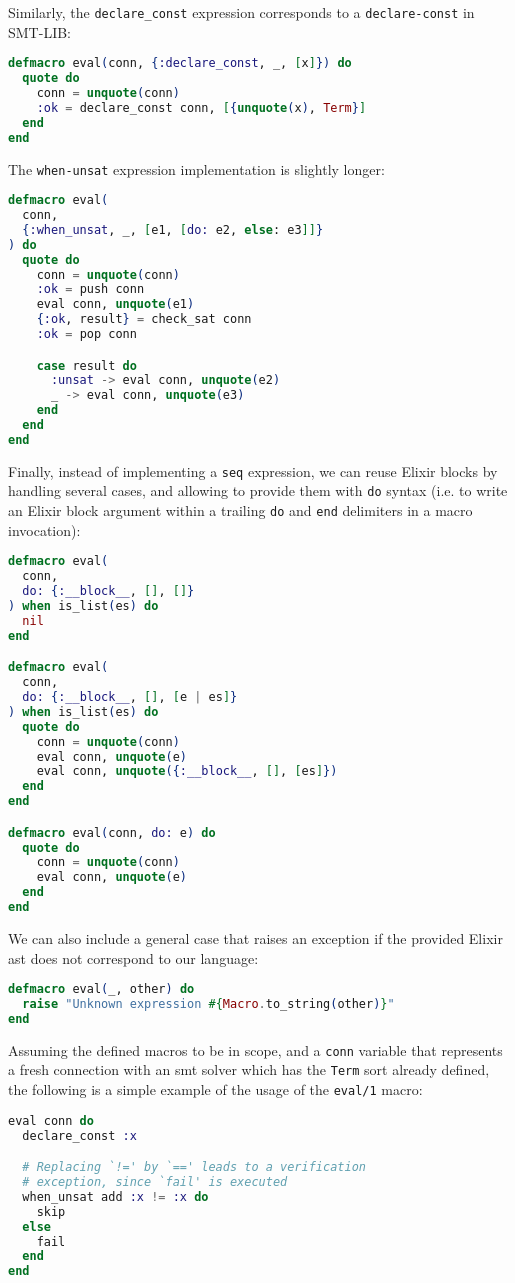 Similarly, the \verb|declare_const| expression corresponds to a
\verb|declare-const| in SMT-LIB:

\begin{lstlisting}[language=elixir,numbers=none,frame=none]
defmacro eval(conn, {:declare_const, _, [x]}) do
  quote do
    conn = unquote(conn)
    :ok = declare_const conn, [{unquote(x), Term}]
  end
end
\end{lstlisting}

The \verb|when-unsat| expression implementation is slightly longer:

\begin{lstlisting}[language=elixir,numbers=none,frame=none]
defmacro eval(
  conn, 
  {:when_unsat, _, [e1, [do: e2, else: e3]]}
) do
  quote do
    conn = unquote(conn)
    :ok = push conn
    eval conn, unquote(e1)
    {:ok, result} = check_sat conn
    :ok = pop conn

    case result do
      :unsat -> eval conn, unquote(e2)
      _ -> eval conn, unquote(e3)
    end
  end
end
\end{lstlisting}

Finally, instead of implementing a \verb|seq| expression, we can reuse Elixir
blocks by handling several cases, and allowing to provide them with \verb|do|
syntax (i.e. to write an Elixir block argument within a trailing \verb|do| and
\verb|end| delimiters in a macro invocation):

\begin{lstlisting}[language=elixir,numbers=none,frame=none]
defmacro eval(
  conn, 
  do: {:__block__, [], []}
) when is_list(es) do
  nil
end

defmacro eval(
  conn, 
  do: {:__block__, [], [e | es]}
) when is_list(es) do
  quote do
    conn = unquote(conn)
    eval conn, unquote(e)
    eval conn, unquote({:__block__, [], [es]})
  end
end

defmacro eval(conn, do: e) do
  quote do
    conn = unquote(conn)
    eval conn, unquote(e)
  end
end
\end{lstlisting}

We can also include a general case that raises an exception if the provided
Elixir \gls{ast} does not correspond to our language:

\begin{lstlisting}[language=elixir,numbers=none,frame=none]
defmacro eval(_, other) do
  raise "Unknown expression #{Macro.to_string(other)}"
end
\end{lstlisting}

Assuming the defined macros to be in scope, and a \verb|conn| variable that
represents a fresh connection with an \acrshort{smt} solver which has the
\verb|Term| sort already defined, the following is a simple example of the usage
of the \verb|eval/1| macro:

\begin{lstlisting}[language=elixir,numbers=none,frame=none]
eval conn do
  declare_const :x

  # Replacing `!=' by `==' leads to a verification
  # exception, since `fail' is executed
  when_unsat add :x != :x do
    skip
  else
    fail
  end
end
\end{lstlisting}
